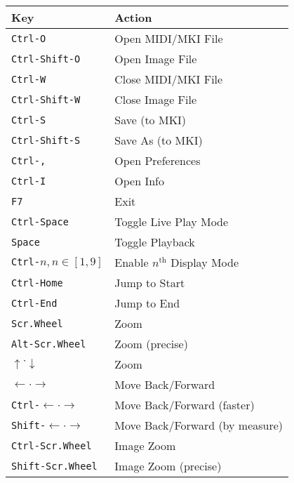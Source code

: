 \documentclass[english]{article}
\makeatletter
\newenvironment{restoretext}%
    {\@parboxrestore%
     \begin{adjustwidth}{}{\leftmargin}%
    }{\end{adjustwidth}
     }
\def\rcbegin{\begin{restoretext}\centering}
\def\rcend{\end{restoretext}}
\providecommand{\mi}[1]{\texttt{#1}}
\makeatother
\begin{document}
\rcbegin
\begin{tabular}{|l|l|}
  \hline
  \textbf{Key}                 														& \textbf{Action} \\
  \hline
  \mi{Ctrl-O}       					 														& Open MIDI/MKI File \\
  \mi{Ctrl-Shift-O} 					 														& Open Image File \\
  \mi{Ctrl-W}       					 														& Close MIDI/MKI File \\
  \mi{Ctrl-Shift-W} 					 														& Close Image File \\
  \mi{Ctrl-S}       					 														& Save (to MKI) \\
  \mi{Ctrl-Shift-S} 					 														& Save As (to MKI) \\
  \mi{Ctrl-,}       					 														& Open Preferences \\
  \mi{Ctrl-I}       					 														& Open Info \\
  \mi{F7}       					     														& Exit \\
  \mi{Ctrl-Space}   					 														& Toggle Live Play Mode \\
  \mi{Space}   					 														      & Toggle Playback \\
  \mi{Ctrl-}$n, n \in [1,9]$   														& Enable $n^\text{th}$ Display Mode\\
  \mi{Ctrl-Home}   					 														  & Jump to Start \\
  \mi{Ctrl-End}   					 														  & Jump to End \\
  \mi{Scr.Wheel}       			 										  				& Zoom \\
  \mi{Alt-Scr.Wheel}       			 										  		& Zoom (precise) \\
  $\uparrow \cdot \downarrow$       			                & Zoom \\
  $\leftarrow \cdot \rightarrow$       			              & Move Back/Forward \\
  \mi{Ctrl-}$\leftarrow \cdot \rightarrow$       			    & Move Back/Forward (faster) \\
  \mi{Shift-}$\leftarrow \cdot \rightarrow$       			  & Move Back/Forward (by measure) \\
  \mi{Ctrl-Scr.Wheel}       			 										  	& Image Zoom \\
  \mi{Shift-Scr.Wheel}       			 										  	& Image Zoom (precise) \\
  \hline
\end{tabular}
\rcend
\end{document}
